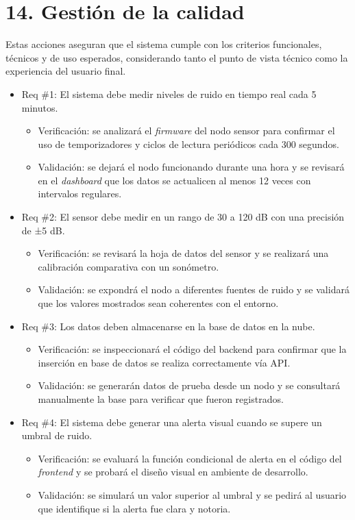\documentclass[
11pt, %
]{charter}
\begin{document}
\section{14. Gestión de la calidad}
\label{sec:calidad}

Estas acciones aseguran que el sistema cumple con los criterios funcionales, técnicos y de uso esperados, considerando tanto 
el punto de vista técnico como la experiencia del usuario final.

\begin{itemize}

\item Req \#1: El sistema debe medir niveles de ruido en tiempo real cada 5 minutos.
\begin{itemize}
	\item Verificación: se analizará el \textit{firmware} del nodo sensor para confirmar el uso de temporizadores y ciclos de lectura 
    periódicos cada 300 segundos.
	\item Validación: se dejará el nodo funcionando durante una hora y se revisará en el \textit{dashboard} que los datos se actualicen 
    al menos 12 veces con intervalos regulares.
\end{itemize}

\item Req \#2: El sensor debe medir en un rango de 30 a 120 dB con una precisión de ±5 dB.
\begin{itemize}
	\item Verificación: se revisará la hoja de datos del sensor y se realizará una calibración comparativa con un sonómetro.
	\item Validación: se expondrá el nodo a diferentes fuentes de ruido y se validará que los valores mostrados sean coherentes 
    con el entorno.
\end{itemize}

\item Req \#3: Los datos deben almacenarse en la base de datos en la nube.
\begin{itemize}
	\item Verificación: se inspeccionará el código del backend para confirmar que la inserción en base de datos se realiza 
    correctamente vía API.
	\item Validación: se generarán datos de prueba desde un nodo y se consultará manualmente la base para verificar que 
    fueron registrados.
\end{itemize}

\item Req \#4: El sistema debe generar una alerta visual cuando se supere un umbral de ruido.
\begin{itemize}
	\item Verificación: se evaluará la función condicional de alerta en el código del \textit{frontend} y se probará el diseño visual en 
    ambiente de desarrollo.
	\item Validación: se simulará un valor superior al umbral y se pedirá al usuario que identifique si la alerta fue clara y 
    notoria.
\end{itemize}


\end{itemize}
\end{document}
